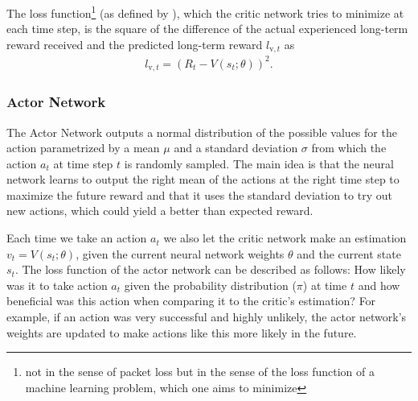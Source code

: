 \documentclass[newfonts=false,format=sigconf,10pt,letterpaper]{acmart}
\newcommand\note[2]{{\color{#1}#2}}
\newcommand\todo[1]{{\note{red}{TODO: #1}}}
\begin{document}


The loss function\footnote{not in the sense of packet loss but in the sense of the loss function of a machine learning problem, which one aims to minimize} (as defined by \cite{mnih_asynchronous_2016}), which the critic network tries to minimize at each time step, is the square of the difference of the actual experienced long-term reward received and the predicted long-term reward $l_{\text{v},t}$ as
\begin{align}
l_{\text{v},t} = \left(R_t - V(s_t; \theta)\right)^2.
\end{align}

\subsubsection{Actor Network}
\label{subsubsec:genericactor}

The Actor Network outputs a normal distribution of the possible values for the action parametrized by a mean $\mu$ and a standard deviation $\sigma$ from which the action $a_t$ at time step $t$ is randomly sampled. The main idea is that the neural network learns to output the right mean of the actions at the right time step to maximize the future reward and that it uses the standard deviation to try out new actions, which could yield a better than expected reward. 

Each time we take an action $a_t$ we also let the critic network make an estimation $v_t = V(s_t; \theta)$, given the current neural network weights $\theta$ and the current state $s_t$. The loss function of the actor network can be described as follows: How likely was it to take action $a_t$ given the probability distribution ($\pi$) at time $t$ and how beneficial was this action when comparing it to the critic's estimation? For example, if an action was very successful and highly unlikely, the actor network's weights are updated to make actions like this more likely in the future. 
\end{document}
